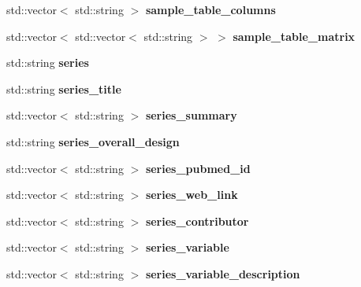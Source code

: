\begin{DoxyCompactItemize}
std\+::vector$<$ std\+::string $>$ {\bfseries sample\+\_\+table\+\_\+columns}
\item 
\mbox{\label{structGeoSoft_a9d11749ade3169e4cdb80dd7e555e879}} 
std\+::vector$<$ std\+::vector$<$ std\+::string $>$ $>$ {\bfseries sample\+\_\+table\+\_\+matrix}
\item 
\mbox{\label{structGeoSoft_a9c7260ea7df5a3f59033194d4f22bc09}} 
std\+::string {\bfseries series}
\item 
\mbox{\label{structGeoSoft_a9d0674a961c4704dff2ebada0c57c375}} 
std\+::string {\bfseries series\+\_\+title}
\item 
\mbox{\label{structGeoSoft_a35169463cb42c03f8a5c06b7ed8fbabc}} 
std\+::vector$<$ std\+::string $>$ {\bfseries series\+\_\+summary}
\item 
\mbox{\label{structGeoSoft_a122b99a56de67951c56a3cd1162df01a}} 
std\+::string {\bfseries series\+\_\+overall\+\_\+design}
\item 
\mbox{\label{structGeoSoft_af27397c8407c2ae47c51ecde69c20ae1}} 
std\+::vector$<$ std\+::string $>$ {\bfseries series\+\_\+pubmed\+\_\+id}
\item 
\mbox{\label{structGeoSoft_a96a19be316b4c7c8d81eb91de82b89d0}} 
std\+::vector$<$ std\+::string $>$ {\bfseries series\+\_\+web\+\_\+link}
\item 
\mbox{\label{structGeoSoft_aa2fb6ad5a800788e6a5d2cc31b300fdd}} 
std\+::vector$<$ std\+::string $>$ {\bfseries series\+\_\+contributor}
\item 
\mbox{\label{structGeoSoft_a8dc23067efcf62394bfeab3198320710}} 
std\+::vector$<$ std\+::string $>$ {\bfseries series\+\_\+variable}
\item 
\mbox{\label{structGeoSoft_a7a428f2f45462f895ba231461484af57}} 
std\+::vector$<$ std\+::string $>$ {\bfseries series\+\_\+variable\+\_\+description}
\item 
\mbox{\label{structGeoSoft_aaea6eba61373277dab0cea861f8ad15b}} 

\end{DoxyCompactItemize}
